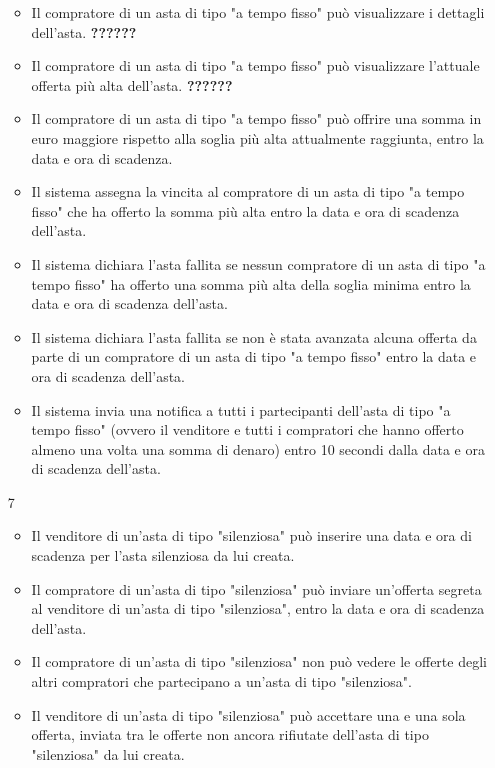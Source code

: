 \begin{itemize}
\begin{itemize}
                    \item Il compratore di un asta di tipo "a tempo fisso" può visualizzare i dettagli dell'asta. \textbf{??????}
                    \item Il compratore di un asta di tipo "a tempo fisso" può visualizzare l'attuale offerta più alta dell'asta. \textbf{??????}
                    \item Il compratore di un asta di tipo "a tempo fisso" può offrire una somma in euro maggiore rispetto alla soglia più alta attualmente raggiunta, entro la data e ora di scadenza.
                    \item Il sistema assegna la vincita al compratore di un asta di tipo "a tempo fisso" che ha offerto la somma più alta entro la data e ora di scadenza dell'asta.
                    \item Il sistema dichiara l'asta fallita se nessun compratore di un asta di tipo "a tempo fisso" ha offerto una somma più alta della soglia minima entro la data e ora di scadenza dell'asta.
                    \item Il sistema dichiara l'asta fallita se non è stata avanzata alcuna offerta da parte di un compratore di un asta di tipo "a tempo fisso" entro la data e ora di scadenza dell'asta.
                    \item Il sistema invia una notifica a tutti i partecipanti dell'asta di tipo "a tempo fisso" (ovvero il venditore e tutti i compratori che hanno offerto almeno una volta una somma di denaro) entro 10 secondi dalla data e ora di scadenza dell'asta.
                \end{itemize}
            \item[7] 
                \begin{itemize}
                    \item Il venditore di un'asta di tipo "silenziosa" può inserire una data e ora di scadenza per l'asta silenziosa da lui creata.
                    \item Il compratore di un'asta di tipo "silenziosa" può inviare un'offerta segreta al venditore di un'asta di tipo "silenziosa", entro la data e ora di scadenza dell'asta.
                    \item Il compratore di un'asta di tipo "silenziosa" non può vedere le offerte degli altri compratori che partecipano a un'asta di tipo "silenziosa".
                    \item Il venditore di un'asta di tipo "silenziosa" può accettare una e una sola offerta, inviata tra le offerte non ancora rifiutate dell'asta di tipo "silenziosa" da lui creata.

\end{itemize}
\end{itemize}
